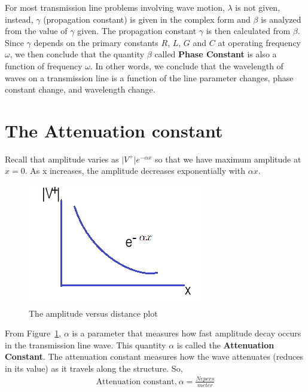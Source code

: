 For most transmission line problems involving wave motion, $\lambda$ is not given, instead, $\gamma$ (propagation constant) is given in the complex form and $\beta$ is analyzed from the value of $\gamma$ given. The propagation constant $\gamma$ is then calculated from $\beta$.
Since $\gamma$ depends on the primary constants $R$, $L$, $G$ and $C$ at operating frequency $\omega$, we then conclude that the quantity $\beta$ called \textbf{Phase Constant} is also a function of frequency $\omega$. In other words, we conclude that the wavelength of waves on a transmission line is a function of the line parameter changes, phase constant change, and wavelength change.
\section{The Attenuation constant}
Recall that amplitude varies as $\lvert V^+ \rvert e^{-\alpha x}$ so that we have maximum amplitude at $x = 0$. As x increases, the amplitude decreases exponentially with $\alpha x$. 
\begin{figure}[h]
\centering
\includegraphics[scale = 0.45]{./graphics/VversusXcurve}
\caption{The amplitude versus distance plot}
\label{fig:VversusXcurve}
\end{figure}

From Figure~\ref{fig:VversusXcurve}, $\alpha$ is a parameter that measures how fast amplitude decay occurs in the transmission line wave. This quantity $\alpha$ is called the \textbf{Attenuation Constant}. The attenuation constant measures how the wave attenuates (reduces in its value) as it travels along the structure. So,
\begin{align*}
\text{Attenuation constant,}\ \alpha = \frac{Nepers}{meter}
\end{align*}

